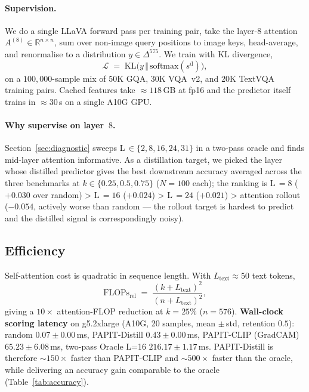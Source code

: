 \documentclass[10pt,twocolumn,letterpaper]{article}
\begin{document}
\paragraph{Supervision.}
We do a single LLaVA forward pass per training pair, take the layer-$8$
attention $A^{(8)}\!\in\!\mathbb{R}^{n\times n}$, sum over non-image
query positions to image keys, head-average, and renormalise to a
distribution $y\in\Delta^{575}$. We train with KL divergence,
\begin{equation}
  \mathcal{L} \;=\; \mathrm{KL}\!\bigl(y\,\Vert\,\mathrm{softmax}(s^{\text{d}})\bigr),
  \label{eq:kl}
\end{equation}
on a $100{,}000$-sample mix of $50$K GQA, $30$K VQA~v2, and $20$K
TextVQA training pairs. Cached features take $\approx118$\,GB at fp16
and the predictor itself trains in $\approx30$\,s on a single A10G GPU.

\paragraph{Why supervise on layer~$8$.}
Section~\ref{sec:diagnostic} sweeps L\,${\in}\{2,8,16,24,31\}$ in a
two-pass oracle and finds mid-layer attention informative. As a
distillation target, we picked the layer whose distilled predictor
gives the best downstream accuracy averaged across the three
benchmarks at $k\!\in\!\{0.25, 0.5, 0.75\}$ ($N{=}100$ each); the
ranking is L\,${=}8$ ($+0.030$ over random) > L\,${=}16$ ($+0.024$) >
L\,${=}24$ ($+0.021$) > attention rollout ($-0.054$, actively worse
than random — the rollout target is hardest to predict and the
distilled signal is correspondingly noisy).

\subsection{Efficiency}
Self-attention cost is quadratic in sequence length. With $L_{\text{text}}\!\approx\!50$
text tokens,
\begin{equation}
  \text{FLOPs}_{\text{rel}}
  \;=\;\frac{(k+L_{\text{text}})^2}{(n+L_{\text{text}})^2},
  \label{eq:flops}
\end{equation}
giving a $10\times$ attention-FLOP reduction at $k{=}25\%$ ($n{=}576$).
\textbf{Wall-clock scoring latency} on g5.2xlarge (A10G, 20 samples,
mean $\pm$\,std, retention $0.5$): random $0.07{\pm}0.00$\,ms,
PAPIT-Distill $\mathbf{0.43{\pm}0.00}$\,ms, PAPIT-CLIP
(GradCAM) $65.23{\pm}6.08$\,ms, two-pass Oracle L=16
$216.17{\pm}1.17$\,ms. PAPIT-Distill is therefore
$\sim\!150\times$ faster than PAPIT-CLIP and $\sim\!500\times$ faster
than the oracle, while delivering an accuracy gain comparable to the
oracle (Table~\ref{tab:accuracy}).
\end{document}
